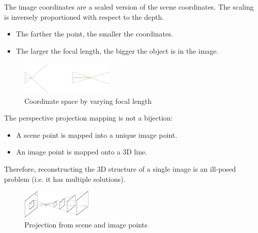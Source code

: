 \begin{description}
        \begin{remark}
            The image coordinates are a scaled version of the scene coordinates.
            The scaling is inversely proportioned with respect to the depth.
            \begin{itemize}
                \item The farther the point, the smaller the coordinates.
                \item The larger the focal length, the bigger the object is in the image.
            \end{itemize}

            \begin{figure}[H]
                \centering
                \includegraphics[width=0.4\textwidth]{./img/perspective_projection_proportion.png}
                \caption{Coordinate space by varying focal length}
            \end{figure}
        \end{remark}

        \begin{remark}
            The perspective projection mapping is not a bijection:
            \begin{itemize}
                \item A scene point is mapped into a unique image point.
                \item An image point is mapped onto a 3D line.
            \end{itemize}
            Therefore, reconstructing the 3D structure of a single image is an ill-posed problem (i.e. it has multiple solutions).

            \begin{figure}[H]
                \centering
                \includegraphics[width=0.3\textwidth]{./img/perspective_projection_loss.png}
                \caption{Projection from scene and image points}
            \end{figure}
        \end{remark}
\end{description}


